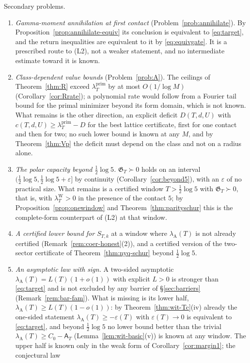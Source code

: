 \documentclass[11pt]{amsart}
\theoremstyle{definition}
\theoremstyle{remark}
\newcommand{\lamP}{\lambda^{\mathrm{prim}}_T}
\newcommand{\lamW}{\lambda^{\mathrm W}_T}
\newcommand{\lamA}{\lambda_{\mathrm A}(T)}
\newcommand{\Aconst}{\mathsf A_T}
\begin{document}
Secondary problems.
\begin{enumerate}
\item \emph{Gamma-moment annihilation at first contact} (Problem~\ref{prob:annihilate}). By
Proposition~\ref{prop:annihilate-equiv} its conclusion is equivalent to \eqref{eq:target}, and the return
inequalities are equivalent to it by \eqref{eq:equivgate}. It is a prescribed route to (L2), not a weaker
statement, and no intermediate estimate toward it is known.
\item \emph{Class-dependent value bounds} (Problem~\ref{prob:A}). The ceilings of Theorem~\ref{thm:R} exceed
$\lamP$ by at most $O(1/\log M)$ (Corollary~\ref{cor:Rrate}); a polynomial rate would follow from a Fourier tail
bound for the primal minimizer beyond its form domain, which is not known. What remains is the other direction, an
explicit deficit $D(T,d,U)$ with $c(T,d,U)\ge\lamP-D$ for the best lattice certificate, first for one contact and
then for two; no such lower bound is known at any $M$, and by Theorem~\ref{thm:Vp} the deficit must depend on
the class and not on a radius alone.
\item \emph{The polar capacity beyond $\frac12\log5$.} $\mathfrak G_T\succ0$ holds on an interval
$(\frac12\log5,\frac12\log5+\varepsilon]$ by continuity (Corollary~\ref{cor:beyond5}), with an $\varepsilon$ of no
practical size. What remains is a certified window $T>\frac12\log5$ with $\mathfrak G_T\succ0$, that is, with
$\lamW>0$ in the presence of the contact $5$; by Proposition~\ref{prop:onewindow} and Theorem~\ref{thm:parityschur}
this is the complete-form counterpart of (L2) at that window.
\item \emph{A certified lower bound for $S_{T,k}$} at a window where $\lamA$ is not already certified
(Remark~\ref{rem:coer-honest}(2)), and a certified version of the two-sector certificate of
Theorem~\ref{thm:nyq-schur} beyond $\frac12\log5$.
\item \emph{An asymptotic law with sign.} A two-sided asymptotic $\lamA=L(T)(1+o(1))$ with explicit $L>0$ is
stronger than \eqref{eq:target} and is not excluded by any barrier of \S\ref{sec:barriers}
(Remark~\ref{rem:bar-fam}). What is missing is its lower half, $\lamA\ge L(T)(1-o(1))$: by
Theorem~\ref{thm:wit-Tc}(iv) already the one-sided statement $\lamA\ge-\varepsilon(T)$ with $\varepsilon(T)\to0$ is
equivalent to \eqref{eq:target}, and beyond $\frac12\log5$ no lower bound better than the trivial
$\lamA\ge C_0-\Aconst$ (Lemma~\ref{lem:wit-basic}(v)) is known at any window. The
upper half is known only in the weak form of Corollary~\ref{cor:margin1}; the conjectural law

\end{enumerate}
\end{document}
